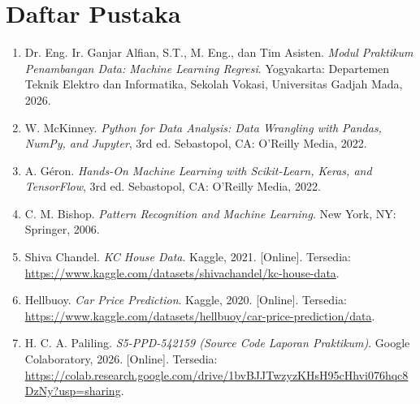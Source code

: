 \chapter{Daftar Pustaka}
\begin{enumerate}
    \item \label{modulPraktikum} Dr. Eng. Ir. Ganjar Alfian, S.T., M. Eng., dan Tim Asisten. \textit{Modul Praktikum Penambangan Data: Machine Learning Regresi}. Yogyakarta: Departemen Teknik Elektro dan Informatika, Sekolah Vokasi, Universitas Gadjah Mada, 2026.
    
    \item \label{mckinney} W. McKinney. \textit{Python for Data Analysis: Data Wrangling with Pandas, NumPy, and Jupyter}, 3rd ed. Sebastopol, CA: O'Reilly Media, 2022.
    
    \item \label{geron} A. Géron. \textit{Hands-On Machine Learning with Scikit-Learn, Keras, and TensorFlow}, 3rd ed. Sebastopol, CA: O'Reilly Media, 2022.
    
    \item \label{bishop} C. M. Bishop. \textit{Pattern Recognition and Machine Learning}. New York, NY: Springer, 2006.
    
    \item \label{kaggleHouse} Shiva Chandel. \textit{KC House Data}. Kaggle, 2021. [Online]. Tersedia: \url{https://www.kaggle.com/datasets/shivachandel/kc-house-data}.
    
    \item \label{kaggleCar} Hellbuoy. \textit{Car Price Prediction}. Kaggle, 2020. [Online]. Tersedia: \url{https://www.kaggle.com/datasets/hellbuoy/car-price-prediction/data}.
    
    \item \label{colabLaporan} H. C. A. Paliling. \textit{S5-PPD-542159 (Source Code Laporan Praktikum)}. Google Colaboratory, 2026. [Online]. Tersedia: \url{https://colab.research.google.com/drive/1bvBJJTwzyzKHsH95cHhvi076hqc8DzNy?usp=sharing}.
\end{enumerate}
